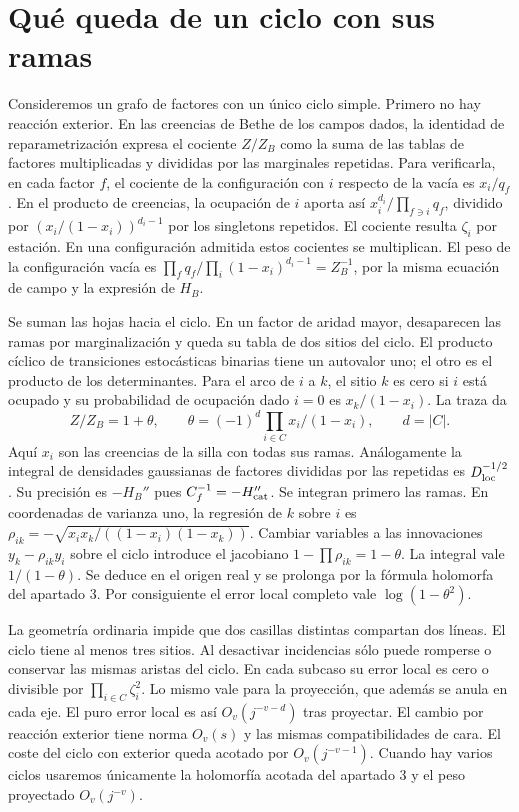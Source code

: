 \section{Qué queda de un ciclo con sus ramas}
Consideremos un grafo de factores con un único ciclo simple. Primero no hay
reacción exterior. En las creencias de Bethe de los campos dados, la identidad
de reparametrización expresa el cociente $Z/Z_B$ como la suma de las tablas
de factores multiplicadas y divididas por las marginales repetidas. Para verificarla,
en cada factor $f$, el cociente de la configuración con $i$ respecto de la vacía
es $x_i/q_f$. En el producto de creencias, la ocupación de $i$ aporta así
$x_i^{d_i}/\prod_{f\ni i}q_f$, dividido por $(x_i/(1-x_i))^{d_i-1}$
por los singletons repetidos. El cociente resulta $\zeta_i$ por estación.
En una configuración admitida estos cocientes se multiplican. El peso de la
configuración vacía es $\prod_f q_f/\prod_i(1-x_i)^{d_i-1}=Z_B^{-1}$, por la
misma ecuación de campo y la expresión de $H_B$.

Se suman las hojas hacia el ciclo. En un factor de aridad mayor, desaparecen
las ramas por marginalización y queda su tabla de dos sitios del ciclo. El producto
cíclico de transiciones estocásticas binarias tiene un autovalor uno; el otro es
el producto de los determinantes. Para el arco de $i$ a $k$, el sitio $k$ es cero
si $i$ está ocupado y su probabilidad de ocupación dado $i=0$ es $x_k/(1-x_i)$.
La traza da
\[
 Z/Z_B=1+\theta,\qquad
 \theta=(-1)^d\prod_{i\in C}x_i/(1-x_i),\qquad d=|C|.
\]
Aquí $x_i$ son las creencias de la silla con todas sus ramas. Análogamente la
integral de densidades gaussianas de factores divididas por las repetidas es
$D_{\rm loc}^{-1/2}$. Su precisión es $-H_B''$ pues $C_f^{-1}=-H_{\rm cat}''$.
Se integran primero las ramas. En coordenadas de varianza uno, la regresión
de $k$ sobre $i$ es $\rho_{ik}=-\sqrt{x_ix_k/((1-x_i)(1-x_k))}$.
Cambiar variables a las innovaciones $y_k-\rho_{ik}y_i$ sobre el ciclo introduce
el jacobiano $1-\prod\rho_{ik}=1-\theta$. La integral vale $1/(1-\theta)$.
Se deduce en el origen real y se prolonga por la fórmula holomorfa del apartado 3.
Por consiguiente el error local completo vale $\log(1-\theta^2)$.

La geometría ordinaria impide que dos casillas distintas compartan dos líneas.
El ciclo tiene al menos tres sitios. Al desactivar incidencias sólo puede romperse
o conservar las mismas aristas del ciclo. En cada subcaso su error local es cero
o divisible por $\prod_{i\in C}\zeta_i^2$. Lo mismo vale para la proyección,
que además se anula en cada eje. El puro error local es así
$O_v(j^{-v-d})$ tras proyectar. El cambio por reacción exterior tiene norma
$O_v(s)$ y las mismas compatibilidades de cara. El coste del ciclo con exterior
queda acotado por $O_v(j^{-v-1})$. Cuando hay varios ciclos usaremos únicamente
la holomorfía acotada del apartado 3 y el peso proyectado $O_v(j^{-v})$.
